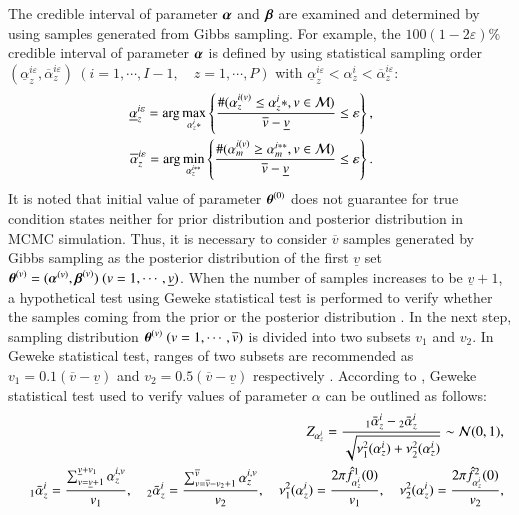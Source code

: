 \documentclass[a4paper,oneside,onecolumn,preprint,10pt,authoryear]{elsarticle}
\begin{document}
The credible interval of parameter $\mbox{\boldmath$\alpha$}$ and $\mbox{\boldmath$\beta$}$ are examined and determined by using samples generated from Gibbs sampling. For example, the $100(1-2\varepsilon)\%$ credible interval of parameter $\mbox{\boldmath$\alpha$}$ is defined by using statistical sampling order  $(\underline{\alpha}^{i\varepsilon}_z,\overline{\alpha}^{i\varepsilon}_z)~(i=1,\cdots,I-1,\quad z=1,\cdots,P)$ with $\underline{\alpha}^{i\varepsilon}_z< \alpha^i_z <\overline{\alpha}^{i\varepsilon}_z$:
 \begin{eqnarray}
      && \hspace{-8mm} \underline{\alpha}^{i\varepsilon}_z
      =\arg \max_{\alpha_z^i\ast} 
       \left\{ \frac{\#(\alpha_z^{i(v)} \leq \alpha_z^i\ast,v
      \in {\cal M})}
      {\overline{v}-\underline{v}}\leq \varepsilon \right\}, \label{sin1} \\
      && \hspace{-8mm} \overline{\alpha}^{i\varepsilon}_z
      =\arg \min_{\alpha_z^{i\ast\ast}} 
      \left\{ \frac{\#(\alpha_m^{i(v)} \geq
      \alpha_m^{i\ast\ast},v\in {\cal M})}
      {\overline{v}-\underline{v}}\leq \varepsilon \right\}. \label{sin2}
   \end{eqnarray}
It is noted that initial value of parameter $\mbox{\boldmath$\theta$}^{(0)}$ does not guarantee for true condition states neither for prior distribution and posterior distribution in MCMC simulation. Thus, it is necessary to consider $\overline{v}$ samples generated by Gibbs sampling as the posterior distribution of the first $\underline{v}$ set $\mbox{\boldmath$\theta$}^{(v)}=(\mbox{\boldmath$\alpha$}^{(v)},\mbox{\boldmath$\beta$}^{(v)})~(v=1,\cdots,\underline{v})$. When the number of samples increases to be $\underline{v}+1$, a hypothetical test using Geweke statistical test is performed to verify whether the samples coming from the prior or the posterior distribution \citep{geweke}. In the next step, sampling distribution $\mbox{\boldmath$\theta$}^{(v)}~(v=1,\cdots,\overline{v})$ is divided into two subsets $v_1$ and $v_2$. In Geweke statistical test, ranges of two subsets are recommended as $v_1=0.1(\overline{v}-\underline{v})$ and $v_2=0.5(\overline{v}-\underline{v})$ respectively \citep{geweke}. According to \citet{chib1,newe1}, Geweke statistical test used to verify values of parameter $\alpha$ can be outlined as follows:
\begin{eqnarray}
&& Z_{\alpha_z^i}=\frac{{}_1\bar{\alpha}_z^i-{}_2\bar{\alpha}_z^i}{\sqrt{\nu_1^2(\alpha_z^i)+\nu_2^2(\alpha_z^i)}}\sim  {\cal N}(0,1),\label{loo} \\
&& {}_1\bar{\alpha}_z^i = \frac{\sum_{v=\underline{v}+1}^{\underline{v}+v_1} \alpha_z^{i,v}}{v_1}, \quad {}_2\bar{\alpha}_z^i=\frac{\sum_{v=\overline{v}-v_2+1}^{\overline{v}} \alpha_z^{i,v}}{v_2}, \quad
 \nu_1^2(\alpha_z^i)=\frac{2\pi \hat{f}_{\alpha_z^i}^1(0)}{v_1}, \quad \nu_2^2(\alpha_z^i)=\frac{2\pi \hat{f}_{\alpha_z^i}^2(0)}{v_2}, \nonumber
\end{eqnarray}
\end{document}
